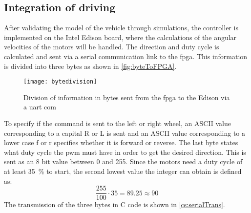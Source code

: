 \subsection{Integration of driving}
After validating the model of the vehicle through simulations, the controller is implemented on the Intel Edison board, where the calculations of the angular velocities of the motors will be handled. 
The direction and duty cycle is calculated and sent via a serial communication link to the \gls{fpga}. This information is divided into three bytes as shown in \autoref{fig:byteToFPGA}.

\begin{figure}[h]
\texttt{[image: bytedivision]}
\caption{Division of information in bytes sent from the \gls{fpga} to the Edison via a \gls{uart} com} 
\label{fig:byteToFPGA}
\end{figure}

To specify if the command is sent to the left or right wheel, an ASCII value corresponding to a capital R or L is sent and an ASCII value corresponding to a lower case f or r specifies whether it is forward or reverse. The last byte states what duty cycle the \gls{pwm} must have in order to get the desired direction. This is sent as an 8 bit value between 0 and 255. Since the motors need a duty cycle of at least \SI{35}{\percent} to start, the second lowest value the integer can obtain is defined as:
\begin{equation}
\frac{255}{100} \cdot 35 = 89.25 \approx 90 
\end{equation}
The transmission of the three bytes in C code is shown in \autoref{cs:serialTrans}.

